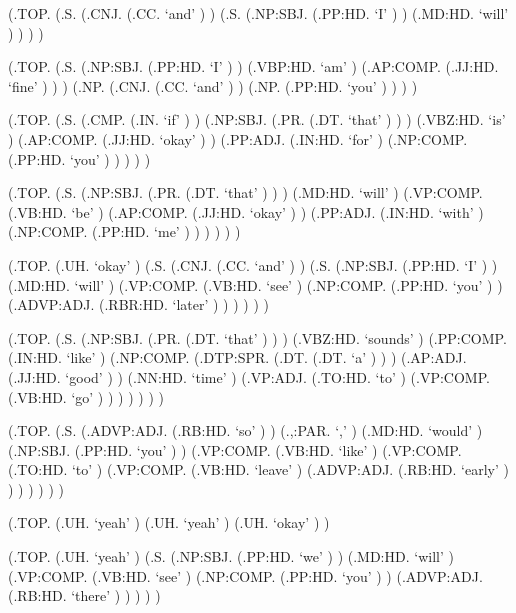 \documentclass[10pt]{article}
\begin{document}
\begin{parsetree}  (.TOP. (.S. (.CNJ. (.CC. `and' ) ) (.S. (.NP:SBJ. (.PP:HD. `I' ) ) (.MD:HD. `will' ) ) ) ) \end{parsetree}

\begin{parsetree}  (.TOP. (.S. (.NP:SBJ. (.PP:HD. `I' ) ) (.VBP:HD. `am' ) (.AP:COMP. (.JJ:HD. `fine' ) ) ) (.NP. (.CNJ. (.CC. `and' ) ) (.NP. (.PP:HD. `you' ) ) ) ) \end{parsetree}

\begin{parsetree}  (.TOP. (.S. (.CMP. (.IN. `if' ) ) (.NP:SBJ. (.PR. (.DT. `that' ) ) ) (.VBZ:HD. `is' ) (.AP:COMP. (.JJ:HD. `okay' ) ) (.PP:ADJ. (.IN:HD. `for' ) (.NP:COMP. (.PP:HD. `you' ) ) ) ) ) \end{parsetree}

\begin{parsetree}  (.TOP. (.S. (.NP:SBJ. (.PR. (.DT. `that' ) ) ) (.MD:HD. `will' ) (.VP:COMP. (.VB:HD. `be' ) (.AP:COMP. (.JJ:HD. `okay' ) ) (.PP:ADJ. (.IN:HD. `with' ) (.NP:COMP. (.PP:HD. `me' ) ) ) ) ) ) \end{parsetree}

\begin{parsetree}  (.TOP. (.UH. `okay' ) (.S. (.CNJ. (.CC. `and' ) ) (.S. (.NP:SBJ. (.PP:HD. `I' ) ) (.MD:HD. `will' ) (.VP:COMP. (.VB:HD. `see' ) (.NP:COMP. (.PP:HD. `you' ) ) (.ADVP:ADJ. (.RBR:HD. `later' ) ) ) ) ) ) \end{parsetree}

\begin{parsetree}  (.TOP. (.S. (.NP:SBJ. (.PR. (.DT. `that' ) ) ) (.VBZ:HD. `sounds' ) (.PP:COMP. (.IN:HD. `like' ) (.NP:COMP. (.DTP:SPR. (.DT. (.DT. `a' ) ) ) (.AP:ADJ. (.JJ:HD. `good' ) ) (.NN:HD. `time' ) (.VP:ADJ. (.TO:HD. `to' ) (.VP:COMP. (.VB:HD. `go' ) ) ) ) ) ) ) \end{parsetree}

\begin{parsetree}  (.TOP. (.S. (.ADVP:ADJ. (.RB:HD. `so' ) ) (.,:PAR. `,' ) (.MD:HD. `would' ) (.NP:SBJ. (.PP:HD. `you' ) ) (.VP:COMP. (.VB:HD. `like' ) (.VP:COMP. (.TO:HD. `to' ) (.VP:COMP. (.VB:HD. `leave' ) (.ADVP:ADJ. (.RB:HD. `early' ) ) ) ) ) ) ) \end{parsetree}

\begin{parsetree}  (.TOP. (.UH. `yeah' ) (.UH. `yeah' ) (.UH. `okay' ) ) \end{parsetree}

\begin{parsetree}  (.TOP. (.UH. `yeah' ) (.S. (.NP:SBJ. (.PP:HD. `we' ) ) (.MD:HD. `will' ) (.VP:COMP. (.VB:HD. `see' ) (.NP:COMP. (.PP:HD. `you' ) ) (.ADVP:ADJ. (.RB:HD. `there' ) ) ) ) ) \end{parsetree}
\end{document}
